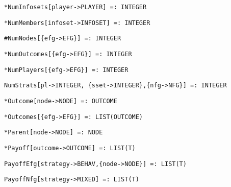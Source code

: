 \protect \large \begin{verbatim}
*NumInfosets[player->PLAYER] =: INTEGER
\end{verbatim}\normalsize

\protect \large \begin{verbatim}
*NumMembers[infoset->INFOSET] =: INTEGER
\end{verbatim}\normalsize

\protect \large \begin{verbatim}
#NumNodes[{efg->EFG}] =: INTEGER
\end{verbatim}\normalsize

\protect \large \begin{verbatim}
*NumOutcomes[{efg->EFG}] =: INTEGER
\end{verbatim} \normalsize

\protect \large \begin{verbatim}
*NumPlayers[{efg->EFG}] =: INTEGER
\end{verbatim} \normalsize

\protect \large \begin{verbatim}
NumStrats[pl->INTEGER, {sset->INTEGER},{nfg->NFG}] =: INTEGER
\end{verbatim}\normalsize

\protect \large \begin{verbatim}
*Outcome[node->NODE] =: OUTCOME
\end{verbatim}\normalsize

\protect \large \begin{verbatim}
*Outcomes[{efg->EFG}] =: LIST(OUTCOME)
\end{verbatim}\normalsize

\protect \large \begin{verbatim}
*Parent[node->NODE] =: NODE
\end{verbatim}\normalsize

\protect \large \begin{verbatim}
*Payoff[outcome->OUTCOME] =: LIST(T)
\end{verbatim}\normalsize

\protect \large \begin{verbatim}
PayoffEfg[strategy->BEHAV,{node->NODE}] =: LIST(T)
\end{verbatim}\normalsize

\protect \large \begin{verbatim}
PayoffNfg[strategy->MIXED] =: LIST(T)
\end{verbatim}\normalsize

